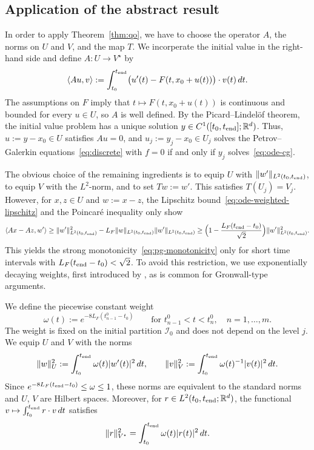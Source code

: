 \documentclass[10pt,reqno]{amsart}
\theoremstyle{definition}
\theoremstyle{remark}
\newcommand{\R}{\mathbb R}
\newcommand{\norm}[1]{\lVert #1\rVert}
\newcommand{\dual}[2]{\langle #1,#2\rangle}
\begin{document}
\subsection{Application of the abstract result}
\noindent
In order to apply Theorem~\ref{thm:qo}, we have to choose the operator $A$, the norms on $U$ and $V$, and the map $T$. We incorperate the initial value in the right-hand side and define $A:U\to V^\star$ by
\begin{equation}\label{eq:ode-operator}
  \dual{Au}{v}
  :=\int_{t_0}^{t_{\rm end}}\bigl(u'(t)-F(t,x_0+u(t))\bigr)\cdot v(t)\,dt.
\end{equation}
The assumptions on $F$ imply that $t\mapsto F(t,x_0+u(t))$ is continuous and bounded for every $u\in U$, so $A$ is well defined. By the Picard--Lindel\"of theorem, the initial value problem has a unique solution $y\in C^1([t_0,t_{\rm end}];\R^d)$. Thus, $u:=y-x_0\in U$ satisfies $Au=0$, and $u_j:=y_j-x_0\in U_j$ solves the Petrov--Galerkin equations~\eqref{eq:discrete} with $f=0$ if and only if $y_j$ solves~\eqref{eq:ode-cg}.

\noindent
The obvious choice of the remaining ingredients is to equip $U$ with $\norm{w'}_{L^2(t_0,t_{\rm end})}$, to equip $V$ with the $L^2$-norm, and to set $Tw:=w'$. This satisfies $T(U_j)=V_j$. However, for $x,z\in U$ and $w:=x-z$, the Lipschitz bound~\eqref{eq:ode-weighted-lipschitz} and the Poincar\'e inequality only show
\[
  \dual{Ax-Az}{w'}
  \ge\norm{w'}_{L^2(t_0,t_{\rm end})}^2-L_F\norm{w}_{L^2(t_0,t_{\rm end})}\norm{w'}_{L^2(t_0,t_{\rm end})}
  \ge\Bigl(1-\frac{L_F(t_{\rm end}-t_0)}{\sqrt2}\Bigr)\norm{w'}_{L^2(t_0,t_{\rm end})}^2.
\]
This yields the strong monotonicity~\eqref{eq:pg-monotonicity} only for short time intervals with $L_F(t_{\rm end}-t_0)<\sqrt2$. To avoid this restriction, we use exponentially decaying weights, first introduced by \cite{bielecki}, as is common for Gronwall-type arguments.

\noindent
We define the piecewise constant weight
\begin{equation}\label{eq:ode-weight}
  \omega(t):=e^{-8L_F(t_{n-1}^0-t_0)}
  \qquad\text{for }t_{n-1}^0<t<t_n^0,\quad n=1,\ldots,m.
\end{equation}
The weight is fixed on the initial partition $\mathcal I_0$ and does not depend on the level $j$. We equip $U$ and $V$ with the norms
\begin{equation}\label{eq:ode-norms}
  \norm{w}_U^2:=\int_{t_0}^{t_{\rm end}}\omega(t)|w'(t)|^2\,dt,
  \qquad
  \norm{v}_V^2:=\int_{t_0}^{t_{\rm end}}\omega(t)^{-1}|v(t)|^2\,dt.
\end{equation}
Since $e^{-8L_F(t_{\rm end}-t_0)}\le\omega\le1$, these norms are equivalent to the standard norms and $U$, $V$ are Hilbert spaces. Moreover, for $r\in L^2(t_0,t_{\rm end};\R^d)$, the functional $v\mapsto\int_{t_0}^{t_{\rm end}}r\cdot v\,dt$ satisfies
\begin{equation}\label{eq:ode-dual-norm}
  \norm{r}_{V^\star}^2=\int_{t_0}^{t_{\rm end}}\omega(t)|r(t)|^2\,dt.
\end{equation}
\end{document}
